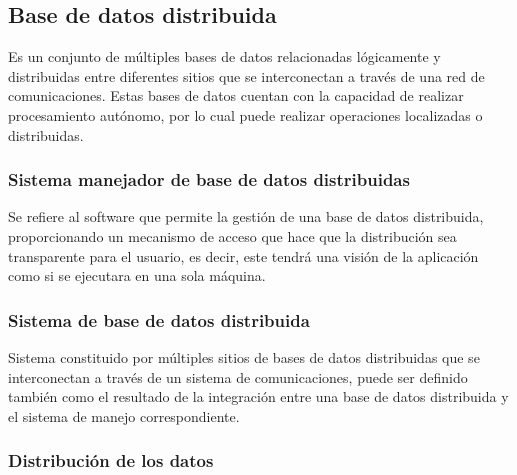 \subsection{Base de datos distribuida}

Es un conjunto de múltiples bases de datos relacionadas lógicamente y distribuidas entre diferentes sitios que se interconectan a través de una red de comunicaciones. Estas bases de datos cuentan con la capacidad de realizar procesamiento autónomo, por lo cual puede realizar operaciones localizadas o distribuidas.\cite{51dd}


\subsubsection{Sistema manejador de base de datos distribuidas}

Se refiere al software que permite la gestión de una base de datos distribuida, proporcionando un mecanismo de acceso que hace que la distribución sea transparente para el usuario, es decir, este tendrá una visión de la aplicación como si se ejecutara en una sola máquina.\cite{51dd}

\subsubsection{Sistema de base de datos distribuida}

Sistema constituido por múltiples sitios de bases de datos distribuidas que se interconectan a través de un sistema de comunicaciones, puede ser definido también como el resultado de la integración entre una base de datos distribuida y el sistema de manejo correspondiente.\cite{51dd}

\subsubsection{Distribución de los datos}

